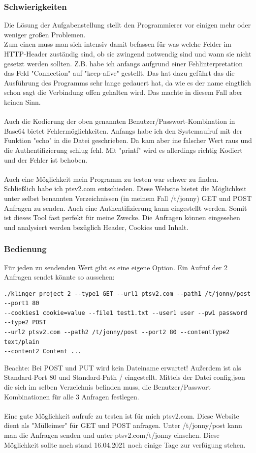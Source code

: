 \documentclass{article}
\begin{document}
\subsubsection{Schwierigkeiten}
Die Lösung der Aufgabenstellung stellt den Programmierer vor einigen mehr oder weniger großen Problemen.\\
Zum einen muss man sich intensiv damit befassen für was welche Felder im HTTP-Header zuständig sind, ob sie zwingend notwendig sind und wann sie nicht gesetzt werden sollten. Z.B. habe ich anfangs aufgrund einer Fehlinterpretation das Feld "Connection" auf "keep-alive" gestellt. Das hat dazu geführt das die Ausführung des Programms sehr lange gedauert hat, da wie es der name eingtlich schon sagt die Verbindung offen gehalten wird. Das machte in diesem Fall aber keinen Sinn. 
\\
\\
Auch die Kodierung der oben genannten Benutzer/Passwort-Kombination in Base64 bietet Fehlermöglichkeiten. Anfangs habe ich den Systemaufruf mit der Funktion "echo" in die Datei geschrieben. Da kam aber ine falscher Wert raus und die Authentifizierung schlug fehl. Mit "printf" wird es allerdings richtig Kodiert und der Fehler ist behoben.
\\
\\
Auch eine Möglichkeit mein Programm zu testen war schwer zu finden. Schließlich habe ich ptsv2.com entschieden. Diese Website bietet die Möglichkeit unter selbst benannten Verzeichnissen (in meinem Fall /t/jonny) GET und POST Anfragen zu senden. Auch eine Authentifizierung kann eingestellt werden. Somit ist dieses Tool fast perfekt für meine Zwecke. Die Anfragen können eingesehen und analysiert werden bezüglich Header, Cookies und Inhalt. 

\subsubsection{Bedienung}
Für jeden zu sendenden Wert gibt es eine eigene Option. Ein Aufruf der 2 Anfragen sendet könnte so aussehen:
\begin{verbatim}
./klinger_project_2 --type1 GET --url1 ptsv2.com --path1 /t/jonny/post --port1 80 
--cookies1 cookie=value --file1 test1.txt --user1 user --pw1 password --type2 POST 
--url2 ptsv2.com --path2 /t/jonny/post --port2 80 --contentType2 text/plain 
--content2 Content ... 
\end{verbatim}
Beachte: Bei POST und PUT wird kein Dateiname erwartet! Außerdem ist als Standard-Port 80 und Standard-Path / eingestellt. Mittels der Datei config.json die sich im selben Verzeichnis befinden muss, die Benutzer/Passwort Kombinationen für alle 3 Anfragen festlegen. 
\\
\\
Eine gute Möglichkeit aufrufe zu testen ist für mich ptsv2.com. Diese Website dient als "Mülleimer" für GET und POST anfragen. Unter /t/jonny/post kann man die Anfragen senden und unter ptsv2.com/t/jonny einsehen. Diese Möglichkeit sollte nach stand 16.04.2021 noch einige Tage zur verfügung stehen. 
\end{document}
